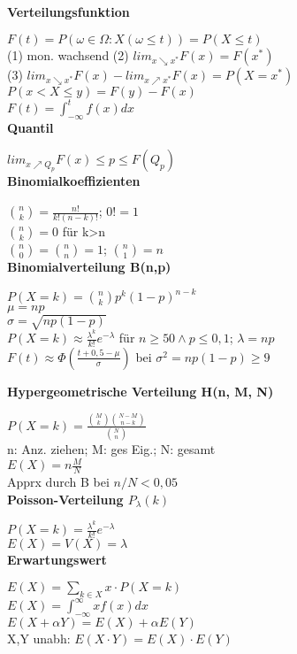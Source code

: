 \documentclass[10pt,twocolumn,a4paper]{article}
\begin{document}
\begin{flushleft}
\textbf{Verteilungsfunktion}

$F(t) = P({\omega \in \Omega: X(\omega \leq t)}) = P(X \leq t)$\\
(1) mon. wachsend (2) $lim_{x\searrow x^*}F(x)=F(x^*)$\\
(3) $lim_{x\searrow x^*}F(x)-lim_{x\nearrow x^*}F(x)=P(X=x^*)$\\
$P(x < X \leq y) = F(y) - F(x)$\\
$F(t) = \int_{-\infty}^t f(x) dx$\\

\textbf{Quantil}

$lim_{x\nearrow Q_p}F(x) \leq p \leq F(Q_p)$\\

\textbf{Binomialkoeffizienten}

$\binom{n}{k} = \frac{n!}{k!(n-k)!}$; $0! = 1$\\
$\binom{n}{k} = 0$ für k>n\\
$\binom{n}{0} = \binom{n}{n} = 1$; $\binom{n}{1} = n$\\

\textbf{Binomialverteilung B(n,p)}

$P(X=k) = \binom{n}{k}p^k(1-p)^{n-k}$\\
$\mu = np$\\
$\sigma = \sqrt{np(1-p)}$\\
$P(X=k) \approx \frac{\lambda^k}{k!}e^{-\lambda}$ für $n \geq 50 \wedge p \leq 0,1$; $\lambda = np$\\
$F(t) \approx \Phi(\frac{t+0,5-\mu}{\sigma})$ bei $\sigma^2 = np(1-p) \geq 9$

\textbf{Hypergeometrische Verteilung H(n, M, N)}

$P(X=k) = \frac{\binom{M}{k}\binom{N-M}{n-k}}{\binom{N}{n}}$\\
n: Anz. ziehen; M: ges Eig.; N: gesamt\\
$E(X) = n\frac{M}{N}$\\
Apprx durch B bei $n/N < 0,05$\\

\textbf{Poisson-Verteilung $P_\lambda(k)$}

$P(X=k) = \frac{\lambda^k}{k!}e^{-\lambda}$\\
$E(X) = V(X) = \lambda$\\

\textbf{Erwartungswert}

$E(X) = \sum_{k \in X} x \cdot P(X=k)$\\
$E(X) = \int_{-\infty}^{\infty} xf(x) dx$\\
$E(X + \alpha Y) = E(X) + \alpha E(Y)$\\
X,Y unabh: $E(X \cdot Y) = E(X) \cdot E(Y)$\\


\end{flushleft}
\end{document}
